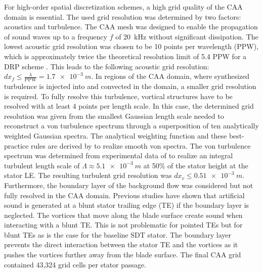 For high-order spatial discretization schemes, a high grid quality of the CAA domain is essential.  The used grid resolution was determined by two factors: acoustics and turbulence.  The CAA mesh was designed to enable the propagation of sound waves up to a frequency $f$ of \SI{20}{kHz} without significant dissipation.  The lowest acoustic grid resolution was chosen to be 10 points per wavelength (PPW), which is approximately twice the theoretical resolution limit of 5.4 PPW for a DRP scheme \cite{de_roeck_overview_2004}. This leads to the following acoustic grid resolution: $dx_f\leq\frac{\lambda}{\text{PPW}}=\SI{1.7e-3}{m}$.  In regions of the CAA domain, where synthesized turbulence is injected into and convected in the domain, a smaller grid resolution is required.  To fully resolve this turbulence, vortical structures have to be resolved with at least 4 points per length scale.  In this case,  the determined grid resolution was given from the smallest Gaussian length scale needed to reconstruct a von \Karman turbulence spectrum through a superposition of ten analytically weighted Gaussian spectra. The analytical weighting function and these best-practice rules are derived by \citet{wohlbrandt_analytical_2016} to realize smooth von \Karman spectra.
The von \Karman turbulence spectrum was determined from experimental data of \citet{podboy_steady_2003} to realize an integral turbulent length scale of $\Lambda\approx\SI{5.1e-3}{m}$ at 50\% of the stator height at the stator LE.  The resulting turbulent grid resolution was  $dx_v\leq\SI{0.51e-3}{m}$.  Furthermore, the boundary layer of the background flow was considered but not fully resolved in the CAA domain. %
Previous studies have shown that artificial sound is generated at a blunt stator trailing edge (TE) if the boundary layer is neglected.  The vortices that move along the blade surface create sound when interacting with a blunt TE.  This is not problematic for pointed TEs but for blunt TEs as is the case for the baseline SDT stator.  The boundary layer prevents the direct interaction between the stator TE and the vortices as it pushes the vortices further away from the blade surface.  The final CAA grid contained 43,324 grid cells per stator passage.     

